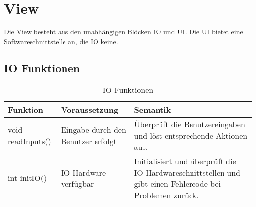 

\clearpage
\section{View}
Die View besteht aus den unabhängigen Blöcken IO und UI. Die UI bietet eine Softwareschnittstelle an, die IO keine.

\subsection{IO Funktionen}
\begin{table}[h!]
    \centering
    \begin{tabular}{|p{5cm}|p{5cm}|p{5cm}|}
        \hline
        \textbf{Funktion} & \textbf{Voraussetzung} & \textbf{Semantik} \\
        \hline
        void readInputs() & Eingabe durch den Benutzer erfolgt & Überprüft die Benutzereingaben und löst entsprechende Aktionen aus. \\
        \hline
        int initIO() & IO-Hardware verfügbar & Initialisiert und überprüft die IO-Hardwareschnittstellen und gibt einen Fehlercode bei Problemen zurück. \\
        \hline
    \end{tabular}
    \caption{IO Funktionen}
    \label{tab:IOFunktionen}
\end{table}

